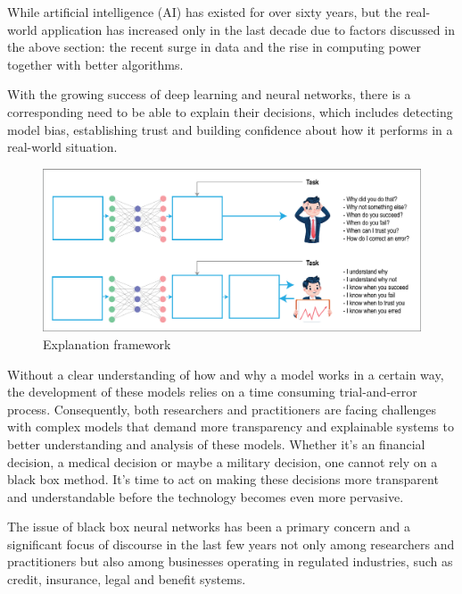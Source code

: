 While artificial intelligence (AI) has existed for over sixty years, but the real-world application has increased only in the last decade due to factors discussed in the above section: the recent surge in data and the rise in computing power together with better algorithms.

With the growing success of deep learning and neural networks, there is a corresponding need to be able to explain their decisions, which includes detecting model bias, establishing trust and building confidence about how it performs in a real-world situation.

\begin{figure}[htbp]
\centering
\includegraphics[width=1\textwidth]{images/XAI-concept.eps}
\caption{Explanation framework}
\label{fig:Explanation framework}
\end{figure}

Without a clear understanding of how and why a model works in a certain way, the development of these models relies on a time consuming trial-and-error process. Consequently, both researchers and practitioners are facing challenges with complex models that demand more transparency and explainable systems to better understanding and analysis of these models. Whether it's an financial decision, a medical decision or maybe a military decision, one cannot rely on a black box method. It's time to act on making these decisions more transparent and understandable before the technology becomes even more pervasive.

The issue of black box neural networks has been a primary concern and a significant focus of discourse in the last few years not only among researchers and practitioners \cite{Samek} but also among businesses operating in regulated industries, such as credit, insurance, legal and benefit systems. 

